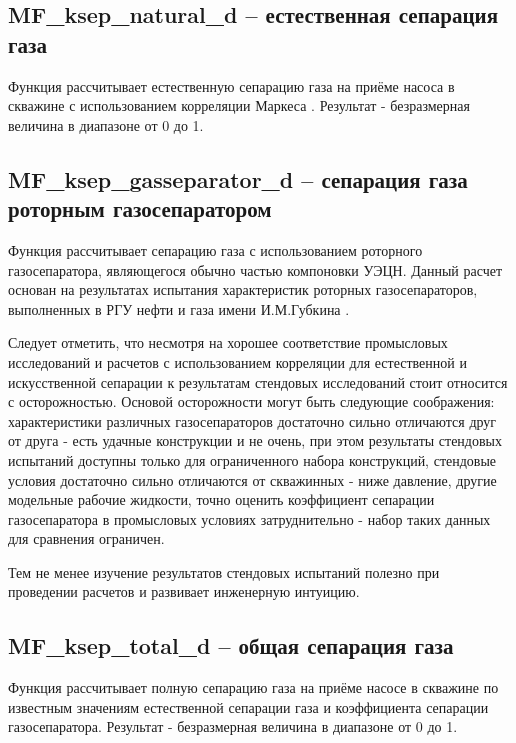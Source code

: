 \subsection{MF\_ksep\_natural\_d – естественная сепарация газа}
Функция рассчитывает естественную сепарацию газа на приёме насоса в скважине с использованием корреляции Маркеса \cite{Marquez_2003} . Результат - безразмерная величина в диапазоне от 0 до 1. 


\subsection{MF\_ksep\_gasseparator\_d – сепарация газа роторным газосепаратором}
Функция рассчитывает сепарацию газа с использованием роторного газосепаратора, являющегося обычно частью компоновки УЭЦН. Данный расчет основан на результатах испытания характеристик роторных газосепараторов, выполненных в РГУ нефти и газа имени И.М.Губкина \cite{SPE_117415_2008}. 

Следует отметить, что несмотря на хорошее соответствие промысловых исследований и расчетов с использованием корреляции для естественной и искусственной сепарации \cite{SPE_117415_2008} к результатам стендовых исследований стоит относится с осторожностью. Основой осторожности могут быть следующие соображения: характеристики различных газосепараторов достаточно сильно отличаются друг от друга - есть удачные конструкции и не очень, при этом результаты стендовых испытаний доступны только для ограниченного набора конструкций, стендовые условия достаточно сильно отличаются от скважинных - ниже давление, другие модельные рабочие жидкости, точно оценить коэффициент сепарации газосепаратора в промысловых условиях затруднительно - набор таких данных для сравнения ограничен. 

Тем не менее изучение результатов стендовых испытаний полезно при проведении расчетов и развивает инженерную интуицию. 



\subsection{MF\_ksep\_total\_d – общая сепарация газа}

Функция рассчитывает полную сепарацию газа на приёме насосе в скважине по известным значениям естественной сепарации газа и коэффициента сепарации газосепаратора. Результат - безразмерная величина в диапазоне от 0 до 1. 

